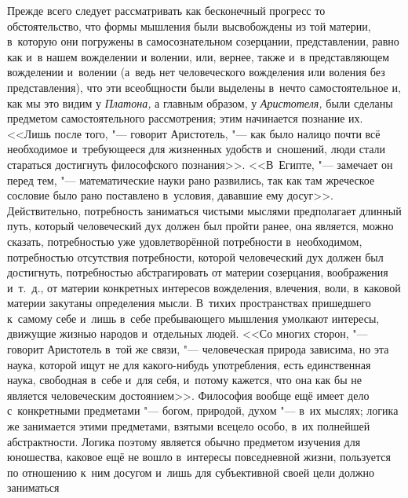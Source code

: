 Прежде всего следует рассматривать как бесконечный прогресс то обстоятельство,
что формы мышления были высвобождены из той материи, в~которую они погружены в
самосознательном созерцании, представлении, равно как и~в нашем вожделении и
волении, или, вернее, также и~в представляющем вожделении и~волении (а~ведь нет
человеческого вожделения или воления без представления), что эти всеобщности
были выделены в~нечто самостоятельное и, как мы это видим у {\em Платона,} а
главным образом, у {\em Аристотеля,} были сделаны предметом самостоятельного
рассмотрения; этим начинается познание их. <<Лишь после того, "--- говорит
Аристотель, "--- как было налицо почти всё необходимое и~требующееся для
жизненных удобств и~сношений, люди стали стараться достигнуть философского
познания>>. <<В~Египте,
"--- замечает он перед тем, "--- математические науки рано развились, так как
там жреческое сословие было рано поставлено в~условия, дававшие ему
досуг>>.
Действительно, потребность заниматься чистыми мыслями предполагает длинный
путь, который человеческий дух должен был пройти ранее, она является, можно
сказать, потребностью уже удовлетворённой потребности в~необходимом,
потребностью отсутствия потребности, которой человеческий дух должен был
достигнуть, потребностью абстрагировать от материи созерцания, воображения
и~т.~д., от материи конкретных интересов вожделения, влечения, воли, в~каковой
материи закутаны определения мысли. В~тихих пространствах пришедшего к~самому
себе и~лишь в~себе пребывающего мышления умолкают интересы, движущие жизнью
народов и~отдельных людей. <<Со многих сторон, "--- говорит Аристотель в~той же
связи, "--- человеческая природа зависима, но эта наука, которой ищут не для
какого-нибудь употребления, есть единственная наука, свободная в~себе и~для
себя, и~потому кажется, что она как бы не является человеческим
достоянием>>. Философия вообще ещё
имеет дело с~конкретными предметами "--- богом, природой, духом "--- в~их
мыслях; логика же занимается этими предметами, взятыми всецело особо, в~их
полнейшей абстрактности. Логика поэтому является обычно предметом изучения для
юношества, каковое ещё не вошло в~интересы повседневной жизни, пользуется по
отношению к~ним досугом и~лишь для субъективной своей цели должно заниматься
